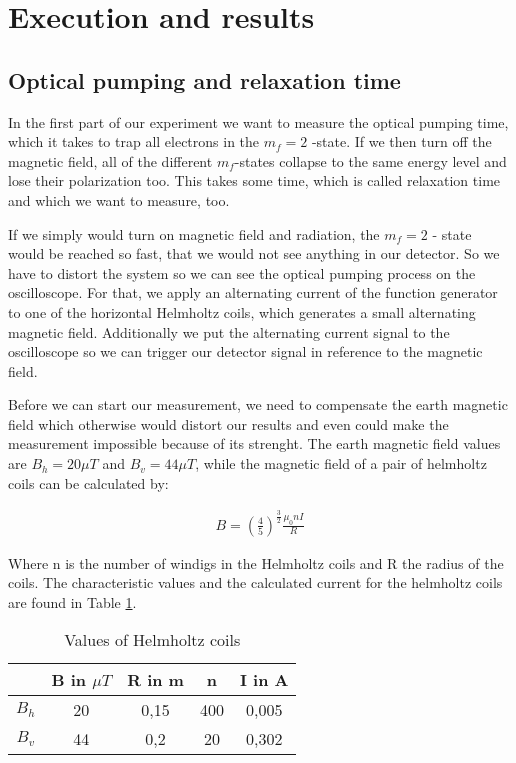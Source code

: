 \section{Execution and results}
\subsection{Optical pumping and relaxation time}
In the first part of our experiment we want to measure the optical pumping time, which it takes to trap all electrons in the $m_f = 2$ -state. If we then turn off the magnetic field, all of the different $m_f$-states collapse to the same energy level and lose their polarization too. This takes some time, which is called relaxation time and which we want to measure, too. 

If we simply would turn on magnetic field and radiation, the $m_f=2$ - state would be reached so fast, that we would not see anything in our detector. So we have to distort the system so we can see the optical pumping process on the oscilloscope. For that, we apply an alternating current of the function generator to one of the horizontal Helmholtz coils, which generates a small alternating magnetic field. Additionally we put the alternating current signal to the oscilloscope so we can trigger our detector signal in reference to the magnetic field. 

Before we can start our measurement, we need to compensate the earth magnetic field which otherwise would distort our results and even could make the measurement impossible because of its strenght. The earth magnetic field values are $B_h= 20 \mu T$ and $B_v = 44 \mu T$, while the magnetic field of a pair of helmholtz coils can be calculated by:

\begin{align}
\label{Bfield}
B= \left(\frac{4}{5}\right)^{\frac{3}{2}}\frac{\mu _0 nI}{R}
\end{align}

Where n is the number of windigs in the Helmholtz coils and R the radius of the coils. The characteristic values and the calculated current for the helmholtz coils are found in Table \ref{coils}. 

\begin{table}[h]
	\caption{Values of Helmholtz coils}
	\begin{tabular}{|c|c|c|c|c|}
	\hline
	 & B in $\mu T$ & R in m & n & I in A \\ \hline
	   $B_h$ & 20 & 0,15 & 400 & 0,005\\ \hline
	   $B_v$ & 44 & 0,2 & 20 & 0,302 \\ \hline
	\end{tabular}
\label{coils}
\end{table}

